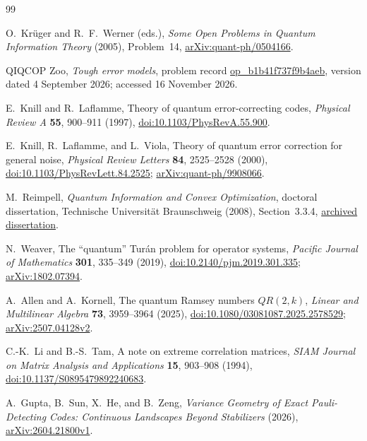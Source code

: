 \documentclass[11pt]{article}
\theoremstyle{remark}
\numberwithin{equation}{section}
\begin{document}
\begin{thebibliography}{99}
\raggedright
{}
O.~Kr\"uger and R.~F.~Werner (eds.),
\emph{Some Open Problems in Quantum Information Theory} (2005),
Problem~14, \href{https://arxiv.org/abs/quant-ph/0504166}{arXiv:quant-ph/0504166}.

QIQCOP Zoo, \emph{Tough error models}, problem record
\href{https://qiqc-op.com/problem/op_b1b41f737f9b4aeb/}{op\_b1b41f737f9b4aeb},
version dated 4 September 2026; accessed 16 November 2026.

E.~Knill and R.~Laflamme, Theory of quantum error-correcting codes,
\emph{Physical Review A} \textbf{55}, 900--911 (1997),
\href{https://doi.org/10.1103/PhysRevA.55.900}{doi:10.1103/PhysRevA.55.900}.

E.~Knill, R.~Laflamme, and L.~Viola,
Theory of quantum error correction for general noise,
\emph{Physical Review Letters} \textbf{84}, 2525--2528 (2000),
\href{https://doi.org/10.1103/PhysRevLett.84.2525}{doi:10.1103/PhysRevLett.84.2525};
\href{https://arxiv.org/abs/quant-ph/9908066}{arXiv:quant-ph/9908066}.

M.~Reimpell, \emph{Quantum Information and Convex Optimization},
doctoral dissertation, Technische Universit\"at Braunschweig (2008),
Section~3.3.4,
\href{https://www.osti.gov/etdeweb/servlets/purl/21161752}{archived dissertation}.

N.~Weaver, The ``quantum'' Tur\'an problem for operator systems,
\emph{Pacific Journal of Mathematics} \textbf{301}, 335--349 (2019),
\href{https://doi.org/10.2140/pjm.2019.301.335}{doi:10.2140/pjm.2019.301.335};
\href{https://arxiv.org/abs/1802.07394}{arXiv:1802.07394}.

A.~Allen and A.~Kornell, The quantum Ramsey numbers $QR(2,k)$,
\emph{Linear and Multilinear Algebra} \textbf{73}, 3959--3964 (2025),
\href{https://doi.org/10.1080/03081087.2025.2578529}{doi:10.1080/03081087.2025.2578529};
\href{https://arxiv.org/abs/2507.04128v2}{arXiv:2507.04128v2}.

C.-K.~Li and B.-S.~Tam, A note on extreme correlation matrices,
\emph{SIAM Journal on Matrix Analysis and Applications} \textbf{15},
903--908 (1994),
\href{https://doi.org/10.1137/S0895479892240683}{doi:10.1137/S0895479892240683}.

A.~Gupta, B.~Sun, X.~He, and B.~Zeng,
\emph{Variance Geometry of Exact Pauli-Detecting Codes:
Continuous Landscapes Beyond Stabilizers} (2026),
\href{https://arxiv.org/abs/2604.21800v1}{arXiv:2604.21800v1}.


\end{thebibliography}
\end{document}
